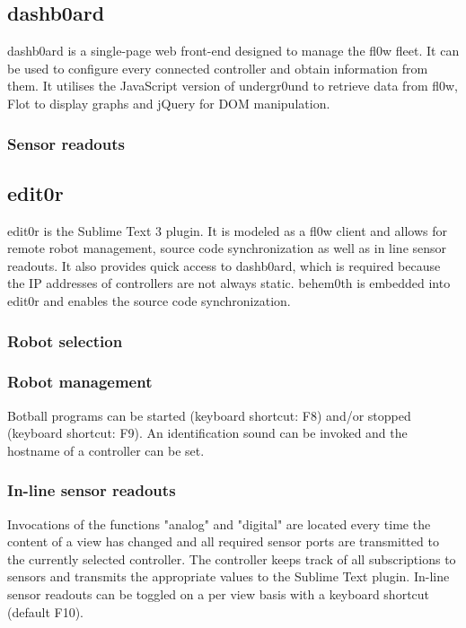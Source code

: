 \documentclass[conference]{IEEEtran}
\begin{document}
\subsection{dashb0ard}
dashb0ard is a single-page web front-end designed to manage the fl0w fleet. It can be used to configure every connected controller and obtain information from them. It utilises the JavaScript version of undergr0und to retrieve data from fl0w, Flot\cite{Flot:David Schnur} to display graphs and jQuery\cite{jQuery:jQuery Foundation} for DOM manipulation.

\subsubsection{Sensor readouts}


\subsection{edit0r}
edit0r is the Sublime Text 3 plugin. It is modeled as a fl0w client and allows for remote robot management, source code synchronization as well as in line sensor readouts. It also provides quick access to dashb0ard, which is required because the IP addresses of controllers are not always static. behem0th\cite{behem0th:Christoph Heiss} is embedded into edit0r and enables the source code synchronization.

\subsubsection{Robot selection}


\subsubsection{Robot management}
Botball programs can be started (keyboard shortcut: F8) and/or stopped (keyboard shortcut: F9). An identification sound can be invoked and the hostname of a controller can be set.

\subsubsection{In-line sensor readouts}
Invocations of the functions "analog" and "digital" are located every time the content of a view has changed and all required sensor ports are transmitted to the currently selected controller. The controller keeps track of all subscriptions to sensors and transmits the appropriate values to the Sublime Text\cite{Sublime Text 3:Sublime HQ} plugin.
In-line sensor readouts can be toggled on a per view basis with a keyboard shortcut (default F10).
\end{document}
